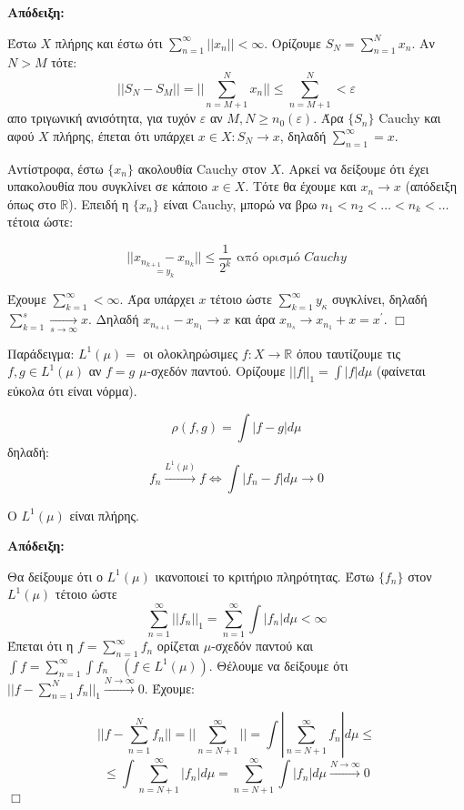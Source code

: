 \textbf{Απόδειξη:} $ $

    
    Έστω $X$ πλήρης και έστω ότι $\sum_{n=1}^{\infty} ||x_n|| < \infty$. Ορίζουμε $S_N = \sum_{n=1}^N x_n$. Αν $N > M$ τότε:
    $$|| S_N - S_M || = || \sum_{n=M+1}^N x_n || \leq \sum_{n = M+1}^N < \varepsilon$$ απο τριγωνική ανισότητα, για τυχόν $\varepsilon$ αν $M,N \geq n_0 (\varepsilon)$. Άρα $\{S_n\}$ Cauchy και αφού $X$ πλήρης, έπεται ότι υπάρχει $x \in X: S_N \rightarrow x$, δηλαδή $\sum_{n=1}^{\infty} = x$.

    
    Αντίστροφα, έστω $\{x_n\}$ ακολουθία Cauchy στον $X$. Αρκεί να δείξουμε ότι έχει υπακολουθία που συγκλίνει σε κάποιο $x \in X$. Τότε θα έχουμε και $x_n \rightarrow x$ (απόδειξη όπως στο $\mathbb R$). Επειδή η $\{x_n\}$ είναι Cauchy, μπορώ να βρω $n_1 < n_2 < \ldots < n_k <\ldots$ τέτοια ώστε:

    $$|| \underset{ = y_k }{x_{n_{k+1}} - x_{n_k}} || \leq \frac1{2^k} \textrm{ από ορισμό } Cauchy$$

    Έχουμε $\sum_{k=1}^{\infty} < \infty$. Άρα υπάρχει $x$ τέτοιο ώστε $\sum_{k=1}^{\infty} y_κ$ συγκλίνει, δηλαδή $\sum_{k=1}^s \underset{s\rightarrow \infty}{\longrightarrow } x$. Δηλαδή $x_{n_{s+1}}-x_{n_1} \rightarrow x$ και άρα $x_{n_s} \rightarrow x_{n_1} + x = x^{\prime}$.
\hfill $\Box$


Παράδειγμα: $L^1(\mu) = $ οι ολοκληρώσιμες $f : X \rightarrow \mathbb R$ όπου ταυτίζουμε τις $f,g \in L^1(\mu)$ αν $f=g$ $\mu$-σχεδόν παντού. Ορίζουμε $||f||_1 = \int |f| d\mu$ (φαίνεται εύκολα ότι είναι νόρμα).

$$\rho (f,g) = \int |f-g|d\mu$$ δηλαδή:
$$f_n \overset{L^1(\mu)}{\longrightarrow } f \Leftrightarrow \int |f_n - f| d\mu \rightarrow 0$$

\begin{protash}
    Ο $L^1(\mu)$ είναι πλήρης.
\end{protash}

\textbf{Απόδειξη:} $ $

    
    Θα δείξουμε ότι ο $L^1(\mu)$ ικανοποιεί το κριτήριο πληρότητας. Έστω $\{f_n\}$ στον $L^1(\mu)$ τέτοιο ώστε $$\sum_{n=1}^{\infty} ||f_n||_1 = \sum_{n=1}^{\infty} \int |f_n| d\mu < \infty$$ Έπεται ότι η $f = \sum_{n=1}^{\infty} f_n$ ορίζεται $\mu$-σχεδόν παντού και $\int f = \sum_{n=1}^{\infty} \int f_n \quad (f \in L^{1}(\mu))$. Θέλουμε να δείξουμε ότι $||f - \sum_{n=1}^{N} f_n||_1 \overset{N \rightarrow \infty}{ \longrightarrow} 0$. Έχουμε:

    $$|| f - \sum_{n=1}^N f_n|| = ||\sum_{n = N+1}^{\infty} || = \int | \sum_{n = N+1}^{\infty} f_n| d\mu \leq$$
    $$\leq \int \sum_{n= N+1}^{\infty} |f_n| d\mu = \sum_{n = N+1}^{\infty} \int |f_n| d\mu \overset{N \rightarrow \infty}{\longrightarrow} 0$$
\hfill $\Box$

